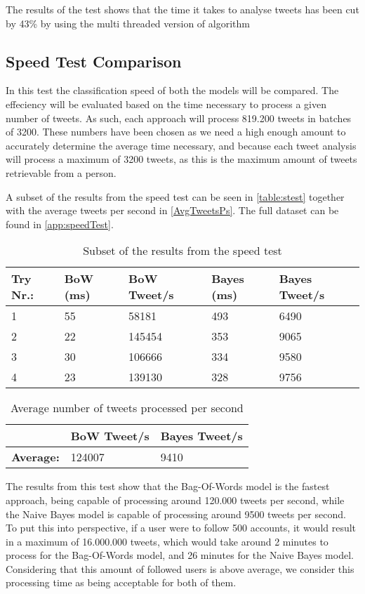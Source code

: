 The results of the test shows that the time it takes to analyse tweets has been
cut by 43\% by using the multi threaded version of algorithm 

\subsection{Speed Test Comparison}
In this test the classification speed of both the models will be compared. The
effeciency will be evaluated based on the time necessary to process a given
number of tweets. As such, each approach will process 819.200 tweets in batches
of 3200. These numbers have been chosen as we need a high enough amount to
accurately determine the average time necessary, and because each tweet
analysis will process a maximum of 3200 tweets, as this is the maximum amount
of tweets retrievable from a person.\nl

A subset of the results from the speed test can be seen in \autoref{table:stest}
together with the average tweets per second in \autoref{AvgTweetsPs}. The
full dataset can be found in \autoref{app:speedTest}.

\begin{table}[H]\centering
\begin{tabular}{|l|l|l|l|l|}
\hline
Try Nr.:	&	BoW (ms)	&	BoW Tweet/s	&	Bayes (ms)	&	Bayes Tweet/s	\\\hline
1	&	55	&	58181	&	493	&	6490 \\\hline
2	&	22	&	145454	&	353	&	9065 \\\hline
3	&	30	&	106666	&	334	&	9580 \\\hline
4	&	23	&	139130	&	328	&	9756 \\\hline		
\end{tabular}
\caption{Subset of the results from the speed test}
\label{table:stest}
\end{table}

\begin{table}[H]\centering
\begin{tabular}{|l|l|l|}\hline
					&	\textbf{BoW Tweet/s}	&	\textbf{Bayes Tweet/s}	\\\hline
\textbf{Average:}	&	124007				&	9410 					\\\hline	
\end{tabular}
\caption{Average number of tweets processed per second}
\label{AvgTweetsPs}
\end{table}

The results from this test show that the Bag-Of-Words model is the fastest
approach, being capable of processing around 120.000 tweets per second, while
the Naive Bayes model is capable of processing around 9500 tweets per second.
To put this into perspective, if a user were to follow 500 accounts, it would
result in a maximum of 16.000.000 tweets, which would take around 2 minutes to
process for the Bag-Of-Words model, and 26 minutes for the Naive Bayes model.
Considering that this amount of followed users is above average, we consider
this processing time as being acceptable for both of them.

